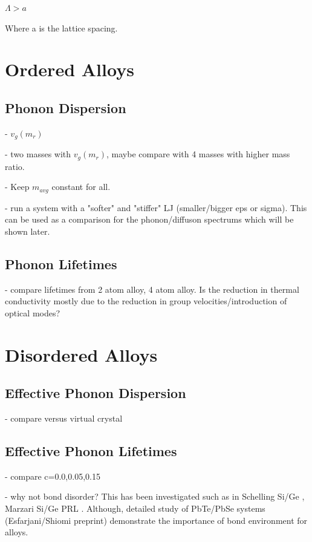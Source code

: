 \documentclass[aps,prb,preprint,superscriptaddress,amsmath,amssymb,floatfix]{revtex4}
\begin{document}
$\Lambda \gt a$

Where a is the lattice spacing.

\section{\label{S-Motivation}Ordered Alloys}

\subsection{\label{S-Introduction-OrderedAlloy-PhonoDispersion}Phonon Dispersion}

- $v_g(m_{r})$

- two masses with $v_g(m_{r})$, maybe compare with 4 masses with higher mass ratio.  

- Keep  $m_{avg}$ constant for all.

- run a system with a "softer" and "stiffer" LJ (smaller/bigger eps or sigma). This can be used as a comparison for the phonon/diffuson spectrums which will be shown later.  


\subsection{\label{S-Introduction-OrderedAlloy-PhonoLife}Phonon Lifetimes}

- compare lifetimes from 2 atom alloy, 4 atom alloy.  Is the reduction in thermal conductivity mostly due to the reduction in group velocities/introduction of optical modes?


\section{\label{S-Motivation}Disordered Alloys}

\subsection{\label{S-Motivation-Amorphous}Effective Phonon Dispersion}

- compare versus virtual crystal

\subsection{\label{S-Motivation-Amorphous}Effective Phonon Lifetimes}

- compare c=0.0,0.05,0.15

- why not bond disorder?  This has been investigated such as in Schelling Si/Ge \cite{schelling2002}, Marzari Si/Ge PRL \cite{Garg2011}.  Although, detailed study of PbTe/PbSe systems (Esfarjani/Shiomi preprint) demonstrate the importance of bond environment for alloys.
\end{document}
